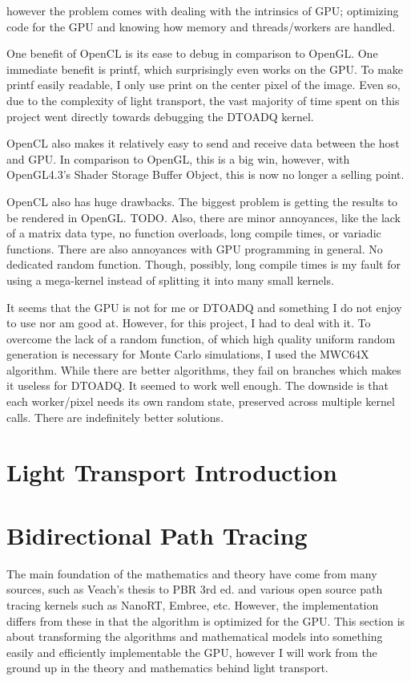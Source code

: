\documentclass{article}
\begin{document}
	however the problem comes with dealing with the intrinsics of GPU; optimizing
code for the GPU and knowing how memory and threads/workers are handled.
  
  	One benefit of OpenCL is its ease to debug in comparison to OpenGL. One
immediate benefit is printf, which surprisingly even works on the GPU. To make
printf easily readable, I only use print on the center pixel of the image. Even
so, due to the complexity of light transport, the vast majority of time spent on
this project went directly towards debugging the DTOADQ kernel.
  	
  	OpenCL also makes it relatively easy to send and receive data between the
host and GPU. In comparison to OpenGL, this is a big win, however, with
OpenGL4.3's Shader Storage Buffer Object, this is now no longer a selling point.
  	
  	OpenCL also has huge drawbacks. The biggest problem is getting the results
to be rendered in OpenGL. TODO. Also, there are minor annoyances, like the lack
of a matrix data type, no function overloads, long compile times, or variadic
functions. There are also annoyances with GPU programming in general. No
dedicated random function. Though, possibly, long compile times is my fault for
using a mega-kernel instead of splitting it into many small kernels.
  	
  	It seems that the GPU is not for me or DTOADQ and something I do not enjoy
to use nor am good at. However, for this project, I had to deal with it. To
overcome the lack of a random function, of which high quality uniform random
generation is necessary for Monte Carlo simulations, I used the MWC64X
algorithm. While there are better algorithms, they fail on branches which makes
it useless for DTOADQ. It seemed to work well enough. The downside is that each
worker/pixel needs its own random state, preserved across multiple kernel calls.
There are indefinitely better solutions.
  \section{Light Transport Introduction}
  \section{Bidirectional Path Tracing}
    The main foundation of the mathematics and theory have come from many
sources, such as Veach's thesis to PBR 3rd ed. and various open source path
tracing kernels such as NanoRT, Embree, etc. However, the implementation differs
from these in that the algorithm is optimized for the GPU. This section is about
transforming the algorithms and mathematical models into something easily and
efficiently implementable the GPU, however I will work from the ground up in the
theory and mathematics behind light transport.
\end{document}
